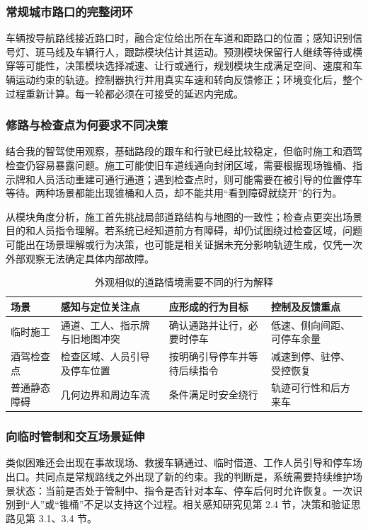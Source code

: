 \documentclass[UTF8,zihao=-4,fontset=windows]{ctexart}
\begin{document}
\subsubsection{常规城市路口的完整闭环}
车辆按导航路线接近路口时，融合定位给出所在车道和距路口的位置；感知识别信号灯、斑马线及车辆行人，跟踪模块估计其运动。预测模块保留行人继续等待或横穿等可能性，决策模块选择减速、让行或通行，规划模块生成满足空间、速度和车辆运动约束的轨迹。控制器执行并用真实车速和转向反馈修正；环境变化后，整个过程重新计算。每一轮都必须在可接受的延迟内完成。
\subsubsection{修路与检查点为何要求不同决策}
结合我的智驾使用观察，基础路段的跟车和行驶已经比较稳定，但临时施工和酒驾检查仍容易暴露问题。施工可能使旧车道线通向封闭区域，需要根据现场锥桶、指示牌和人员活动重建可通行通道；遇到检查点时，则可能需要在被引导的位置停车等待。两种场景都能出现锥桶和人员，却不能共用“看到障碍就绕开”的行为。

从模块角度分析，施工首先挑战局部道路结构与地图的一致性；检查点更突出场景目的和人员指令理解。若系统已经知道前方有障碍，却仍试图绕过检查区域，问题可能出在场景理解或行为决策，也可能是相关证据未充分影响轨迹生成，仅凭一次外部观察无法确定具体内部故障。
\begin{table}[H]\centering\small\caption{外观相似的道路情境需要不同的行为解释}
\begin{tabularx}{\textwidth}{p{2.2cm}XXX}\toprule
场景 & 感知与定位关注点 & 应形成的行为目标 & 控制及反馈重点\\\midrule
临时施工 & 通道、工人、指示牌与旧地图冲突 & 确认通路并让行，必要时停车 & 低速、侧向间距、可停车余量\\
酒驾检查点 & 检查区域、人员引导及停车位置 & 按明确引导停车并等待后续指令 & 减速到停、驻停、受控恢复\\
普通静态障碍 & 几何边界和周边车流 & 条件满足时安全绕行 & 轨迹可行性和后方来车\\\bottomrule\end{tabularx}\end{table}
\subsubsection{向临时管制和交互场景延伸}
类似困难还会出现在事故现场、救援车辆通过、临时借道、工作人员引导和停车场出口。共同点是常规路线之外出现了新的约束。我的判断是，系统需要持续维护场景状态：当前是否处于管制中、指令是否针对本车、停车后何时允许恢复。一次识别到“人”或“锥桶”不足以支持这个过程。相关感知研究见第 2.4 节，决策和验证思路见第 3.1、3.4 节。
\end{document}

